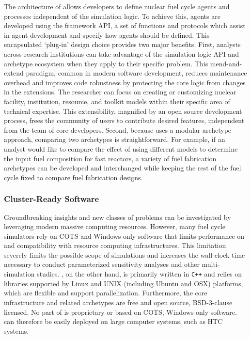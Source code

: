 The architecture of \Cyclus allows developers 
to define nuclear fuel cycle agents and processes independent of the simulation 
logic. To achieve this, agents are developed using the \Cyclus framework \gls{API}, a set of functions and protocols
which 
assist in agent development and specify how agents should be defined. 
This encapsulated `plug-in'
design choice provides two major benefits. First, analysts across research institutions can take advantage of the 
simulation logic \gls{API} and archetype ecosystem when they apply \Cyclus to 
their specific problem. This 
mend-and-extend paradigm, common in modern software development, reduces 
maintenance overhead and improves code robustness by protecting the core logic 
from changes in the extensions. 
The researcher can focus on creating or customizing nuclear 
facility, institution, resource, and toolkit models within their specific area 
of technical expertise. This extensibility, magnified by an open source 
development process, frees the community of users to contribute desired 
features, independent from the team of \Cyclus core developers. 
Second, because \Cyclus uses a modular archetype approach, comparing two 
archetypes is straightforward. For example, if an analyst would like 
to compare the effect of using different models to determine the input fuel 
composition for fast reactors, a variety of fuel fabrication archetypes can be 
developed and interchanged while keeping the rest of the fuel cycle fixed
 to compare fuel fabrication designs.

\subsubsection{Cluster-Ready Software}

Groundbreaking insights and new classes of problems can be investigated by 
leveraging modern massive computing resources.
However, many fuel cycle simulators rely on \gls{COTS} and Windows-only software that limits 
performance on and compatibility with resource computing infrastructures. This limitation severely 
limits the possible scope of simulations and increases the wall-clock time necessary to conduct parameterized sensitivity 
analyses and other multi-simulation studies. \Cyclus, on the other hand, is 
primarily written in \texttt{C++} and relies on 
libraries supported by Linux and UNIX (including Ubuntu and OSX) platforms, 
which are flexible and support parallelization. 
Furthermore, the core infrastructure and related archetypes are free and 
open source, BSD-3-clause licensed. No part of \Cyclus is proprietary or based 
on \gls{COTS}, Windows-only software. \Cyclus can therefore be easily deployed 
on large computer systems, such as \gls{HTC} systems.

